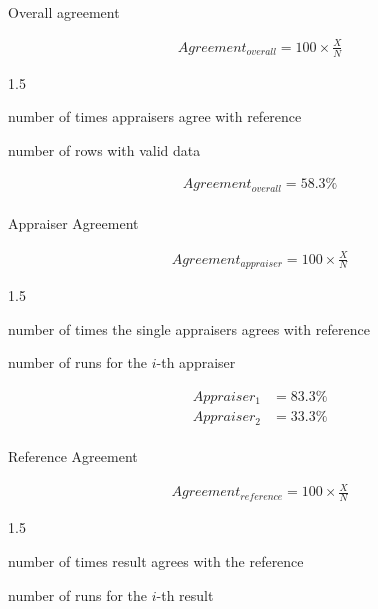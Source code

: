 \documentclass[
  a4paper,
]{scrbook}
\makeatletter
\let\oldparagraph\paragraph
\renewcommand{\paragraph}{
    \@ifstar
      \xxxParagraphStar
      \xxxParagraphNoStar
  }
\newcommand{\xxxParagraphStar}[1]{\oldparagraph*{#1}\mbox{}}
\newcommand{\xxxParagraphNoStar}[1]{\oldparagraph{#1}\mbox{}}
\providecommand{\tightlist}{%
  \setlength{\itemsep}{0pt}\setlength{\parskip}{0pt}}\usepackage{longtable,booktabs,array}
\let\olddescription\description
\let\endolddescription\enddescription
\renewenvironment{description}{
          \begin{spacing}{1.5}\olddescription
        }{
          \endolddescription\end{spacing}
        }
\makeatother
\begin{document}
\paragraph{Overall agreement}\label{overall-agreement}

\begin{align}
Agreement_{overall} = 100 \times \frac{X}{N}
\end{align}

\begin{description}
\tightlist
\item[\(X\)]
number of times appraisers agree with reference
\item[\(N\)]
number of rows with valid data
\end{description}

\begin{align}
Agreement_{overall} = 58.3\% \nonumber
\end{align}

\paragraph{Appraiser Agreement}\label{appraiser-agreement}

\begin{align}
Agreement_{appraiser} = 100 \times \frac{X}{N}
\end{align}

\begin{description}
\tightlist
\item[\(X\)]
number of times the single appraisers agrees with reference
\item[\(N_i\)]
number of runs for the \(i\)-th appraiser
\end{description}

\begin{align}
Appraiser_{1} &= 83.3\% \nonumber \\
Appraiser_{2} &= 33.3\% \nonumber
\end{align}

\paragraph{Reference Agreement}\label{reference-agreement}

\begin{align}
Agreement_{reference} = 100 \times \frac{X}{N}
\end{align}

\begin{description}
\tightlist
\item[\(X\)]
number of times result agrees with the reference
\item[\(N_i\)]
number of runs for the \(i\)-th result
\end{description}
\end{document}
